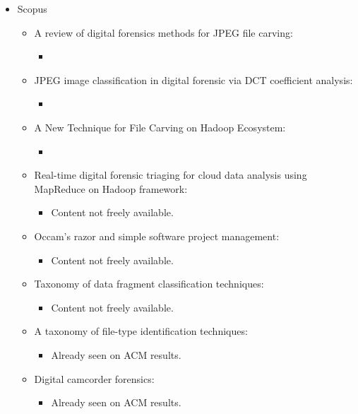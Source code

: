 \begin{itemize}
    \item Scopus
    \begin{itemize}
        \item \cite{Ali20185841} A review of digital forensics methods for JPEG file carving:
        \begin{itemize}
            \item
        \end{itemize}
        \item \cite{Alherbawi201812805} JPEG image classification in digital forensic via DCT coefficient analysis:
        \begin{itemize}
            \item
        \end{itemize}
        \item \cite{Alshammari201872} A New Technique for File Carving on Hadoop Ecosystem:
        \begin{itemize}
            \item
        \end{itemize}
        \item \cite{Povar2015119} Real-time digital forensic triaging for cloud data analysis using MapReduce on Hadoop framework:
        \begin{itemize}
            \item Content not freely available.
        \end{itemize}
        \item \cite{Menzies2014447} Occam's razor and simple software project management:
        \begin{itemize}
            \item Content not freely available.
        \end{itemize}
        \item \cite{Poisel201467} Taxonomy of data fragment classification techniques:
        \begin{itemize}
            \item Content not freely available.
        \end{itemize}
        \item \cite{Alamri:2014:TFI:2638404.2638524} A taxonomy of file-type identification techniques:
        \begin{itemize}
            \item Already seen on ACM results.
        \end{itemize}
        \item \cite{Ariffin:2013:DCF:2525483.2525488} Digital camcorder forensics:
        \begin{itemize}
            \item Already seen on ACM results.
        \end{itemize}
    \end{itemize}
\end{itemize}

